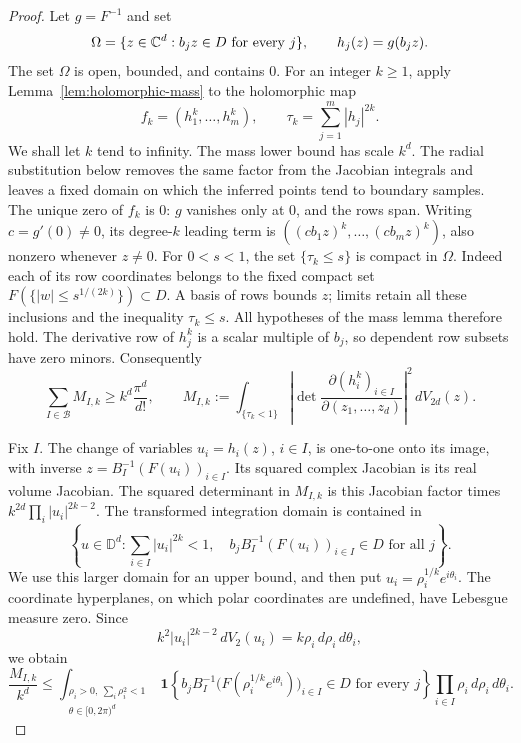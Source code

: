 \begin{proof}
Let $g=F^{-1}$ and set
\[
 \Omega=\{z\in\mathbb C^d:b_jz\in D\text{ for every }j\},
 \qquad h_j(z)=g(b_jz).
\]
The set $\Omega$ is open, bounded, and contains $0$. For an integer
$k\geq1$, apply Lemma~\ref{lem:holomorphic-mass} to the holomorphic map
\[
 f_k=(h_1^k,\ldots,h_m^k),\qquad
 \tau_k=\sum_{j=1}^m|h_j|^{2k}.
\]
We shall let $k$ tend to infinity. The mass lower bound has scale
$k^d$. The radial substitution below removes the same factor from the
Jacobian integrals and leaves a fixed domain on which the inferred
points tend to boundary samples.
The unique zero of $f_k$ is $0$: $g$ vanishes only at $0$, and the rows span.
Writing $c=g'(0)\ne0$, its degree-$k$ leading term is
$((cb_1z)^k,\ldots,(cb_mz)^k)$, also nonzero whenever $z\ne0$.
For $0<s<1$, the set $\{\tau_k\leq s\}$ is compact in $\Omega$.
Indeed each of its row coordinates belongs to the fixed compact set
$F(\{|w|\leq s^{1/(2k)}\})\subset D$. A basis of rows bounds $z$;
limits retain all these inclusions and the inequality $\tau_k\leq s$.
All hypotheses of the mass lemma therefore hold.
The derivative row of $h_j^k$ is a scalar multiple of $b_j$, so dependent
row subsets have zero minors. Consequently
\begin{equation}\label{eq:feasibility-mass}
 \sum_{I\in\mathcal B}M_{I,k}\geq
 k^d\frac{\pi^d}{d!},\qquad
 M_{I,k}:=\int_{\{\tau_k<1\}}
 \left|\det\frac{\partial(h_i^k)_{i\in I}}
                        {\partial(z_1,\ldots,z_d)}\right|^2\,dV_{2d}(z).
\end{equation}

Fix $I$. The change of variables $u_i=h_i(z)$, $i\in I$, is one-to-one
onto its image, with inverse
$z=B_I^{-1}(F(u_i))_{i\in I}$. Its squared complex Jacobian is its real
volume Jacobian. The squared determinant in $M_{I,k}$ is this Jacobian factor
times $k^{2d}\prod_i|u_i|^{2k-2}$.
The transformed integration domain is contained in
\[
 \left\{u\in\mathbb D^d:
       \sum_{i\in I}|u_i|^{2k}<1,\quad
       b_jB_I^{-1}(F(u_i))_{i\in I}\in D\text{ for all }j\right\}.
\]
We use this larger domain for an upper bound, and then put
$u_i=\rho_i^{1/k}e^{i\theta_i}$. The coordinate hyperplanes, on which
polar coordinates are undefined, have Lebesgue measure zero. Since
\[
 k^2|u_i|^{2k-2}\,dV_2(u_i)
      =k\rho_i\,d\rho_i\,d\theta_i,
\]
we obtain
\begin{equation}\label{eq:feasibility-radial}
 \frac{M_{I,k}}{k^d}\leq
 \int_{\substack{\rho_i>0,\ \sum_i\rho_i^2<1\\
                  \theta\in[0,2\pi)^d}}
 \mathbf1\!\left\{
  b_jB_I^{-1}\bigl(F(\rho_i^{1/k}e^{i\theta_i})\bigr)_{i\in I}
                    \in D\text{ for every }j\right\}
 \prod_{i\in I}\rho_i\,d\rho_i\,d\theta_i.
\end{equation}


\end{proof}

